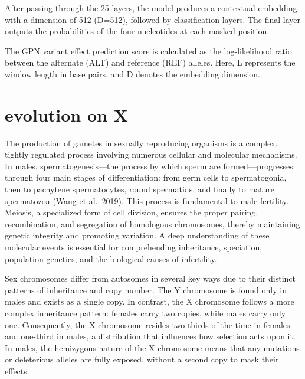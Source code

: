 \documentclass[
  a4paper,
]{scrbook}
\begin{document}
After passing through the 25 layers, the model produces a contextual
embedding with a dimension of 512 (D=512), followed by classification
layers. The final layer outputs the probabilities of the four
nucleotides at each masked position.

The GPN variant effect prediction score is calculated as the
log-likelihood ratio between the alternate (ALT) and reference (REF)
alleles. Here, L represents the window length in base pairs, and D
denotes the embedding dimension.

\chapter{evolution on X}\label{evolution-on-x}

The production of gametes in sexually reproducing organisms is a
complex, tightly regulated process involving numerous cellular and
molecular mechanisms. In males, spermatogenesis---the process by which
sperm are formed---progresses through four main stages of
differentiation: from germ cells to spermatogonia, then to pachytene
spermatocytes, round spermatids, and finally to mature spermatozoa
\cite{Wang2019}(Wang et al.~2019). This process is fundamental to male
fertility. Meiosis, a specialized form of cell division, ensures the
proper pairing, recombination, and segregation of homologous
chromosomes, thereby maintaining genetic integrity and promoting
variation. A deep understanding of these molecular events is essential
for comprehending inheritance, speciation, population genetics, and the
biological causes of infertility.

Sex chromosomes differ from autosomes in several key ways due to their
distinct patterns of inheritance and copy number. The Y chromosome is
found only in males and exists as a single copy. In contrast, the X
chromosome follows a more complex inheritance pattern: females carry two
copies, while males carry only one. Consequently, the X chromosome
resides two-thirds of the time in females and one-third in males, a
distribution that influences how selection acts upon it. In males, the
hemizygous nature of the X chromosome means that any mutations or
deleterious alleles are fully exposed, without a second copy to mask
their effects.
\end{document}

